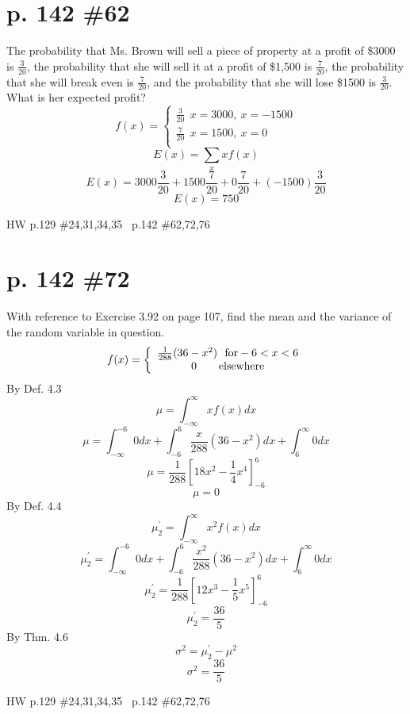 \documentclass[12pt]{article}
\begin{document}
\section[20pt]{p. 142 \#62}
The probability that Ms. Brown will sell a piece of property at a profit of \$3000 is \(\frac{3}{20}\), the probability that she will sell it at a profit of \$1,500 is \(\frac{7}{20}\), the probability that she will break even is \(\frac{7}{20}\), and the probability that she will lose \$1500 is \(\frac{3}{20}\). What is her expected profit? \newline
\newline
\[f(x)=\left\{\begin{array}{ccc}
\frac{3}{20} \ \ x = 3000,\ x = -1500\\
\frac{7}{20} \ \ x = 1500,\ x = 0\\

\end{array}\right.\]
\[E(x) = \sum_x{xf(x)}\]
\[E(x) = 3000\frac{3}{20}+1500\frac{7}{20}+0\frac{7}{20}+(-1500)\frac{3}{20}\]
\[E(x) = 750\]
\newpage
\maketitle HW p.129 \#24,31,34,35 \ p.142 \#62,72,76

\section[20pt]{p. 142 \#72}
With reference to Exercise 3.92 on page 107, find the mean and the variance of the random variable in question.
\[f(x)=\left\{\begin{array}{ccc}
\frac{1}{288}(36-x^2) \ \ \textup{for} -6<x<6\\
0 \ \ \ \ \ \ \textup{elsewhere}
\end{array}\right.\]
By Def. 4.3
\[\mu = \int_{-\infty}^{\infty}xf(x)dx\]
\[\mu = \int_{-\infty}^{-6}0dx+\int_{-6}^{6}\frac{x}{288}(36-x^2)dx+\int_{6}^{\infty}0dx\]
\[\mu = \frac{1}{288}[18x^2-\frac{1}{4}x^4]_{-6}^6\]
\[\mu = 0\]
By Def. 4.4
\[\mu^{'}_{2}=\int_{-\infty}^{\infty}x^2f(x)dx\]
\[\mu^{'}_{2}=\int_{-\infty}^{-6}0dx+\int_{-6}^{6}\frac{x^2}{288}(36-x^2)dx+\int_{6}^{\infty}0dx\]
\[\mu^{'}_{2} = \frac{1}{288}[12x^3-\frac{1}{5}x^5]_{-6}^6\]
\[\mu^{'}_{2}=\frac{36}{5}\]
By Thm. 4.6
\[\sigma^2=\mu^{'}_{2}-\mu^2\]
\[\sigma^2=\frac{36}{5}\]
\newpage
\maketitle HW p.129 \#24,31,34,35 \ p.142 \#62,72,76
\end{document}

